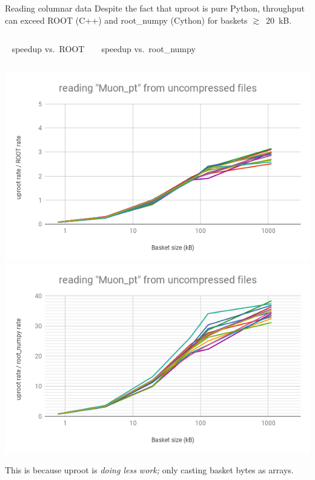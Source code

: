 \documentclass[aspectratio=169]{beamer}
\begin{document}
\begin{frame}{Reading columnar data}
\vspace{0.5 cm}
Despite the fact that uproot is pure Python, throughput can exceed ROOT (C++) and root\_numpy (Cython) for baskets $\gtrsim$~20~kB.

\vspace{0.5 cm}
\begin{columns}
\small
\mbox{ } \hfill \hfill speedup vs.\ ROOT \hfill \mbox{ }
\small
\mbox{ } \hfill speedup vs.\ root\_numpy \hfill \hfill \mbox{ }
\end{columns}

\includegraphics[width=0.5\linewidth]{root-none-muon.png}\includegraphics[width=0.5\linewidth]{rootnumpy-none-muon.png}

\vspace{0.25 cm}
This is because uproot is {\it doing less work;} only casting basket bytes as arrays.
\end{frame}
\end{document}
